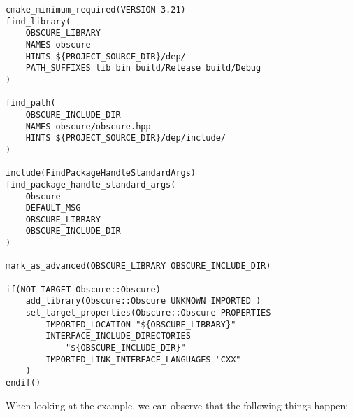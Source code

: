 \begin{lstlisting}[style=styleCMake]
cmake_minimum_required(VERSION 3.21)
find_library(
	OBSCURE_LIBRARY
	NAMES obscure
	HINTS ${PROJECT_SOURCE_DIR}/dep/
	PATH_SUFFIXES lib bin build/Release build/Debug
)

find_path(
	OBSCURE_INCLUDE_DIR
	NAMES obscure/obscure.hpp
	HINTS ${PROJECT_SOURCE_DIR}/dep/include/
)

include(FindPackageHandleStandardArgs)
find_package_handle_standard_args(
	Obscure
	DEFAULT_MSG
	OBSCURE_LIBRARY
	OBSCURE_INCLUDE_DIR
)

mark_as_advanced(OBSCURE_LIBRARY OBSCURE_INCLUDE_DIR)

if(NOT TARGET Obscure::Obscure)
	add_library(Obscure::Obscure UNKNOWN IMPORTED )
	set_target_properties(Obscure::Obscure PROPERTIES
		IMPORTED_LOCATION "${OBSCURE_LIBRARY}"
		INTERFACE_INCLUDE_DIRECTORIES
			"${OBSCURE_INCLUDE_DIR}"
		IMPORTED_LINK_INTERFACE_LANGUAGES "CXX"
	)
endif()
\end{lstlisting}

When looking at the example, we can observe that the following things happen:

